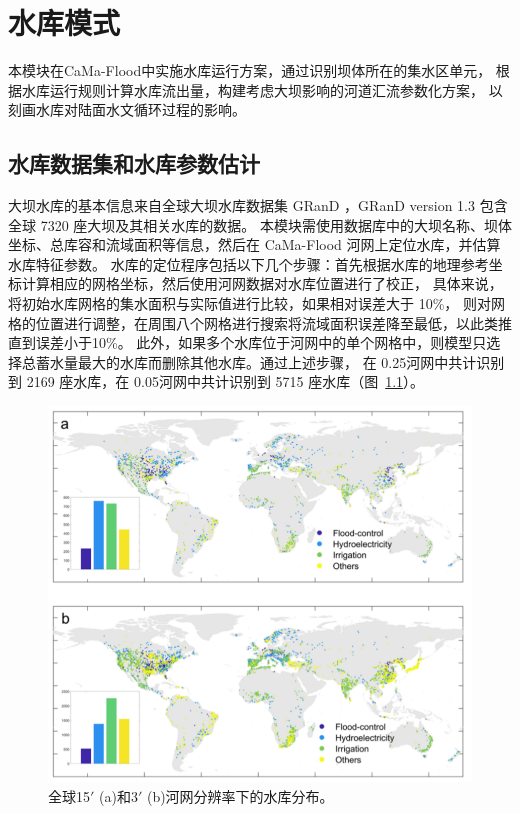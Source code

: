 \chapter{水库模式}

    本模块在CaMa-Flood中实施水库运行方案，通过识别坝体所在的集水区单元，
    根据水库运行规则计算水库流出量，构建考虑大坝影响的河道汇流参数化方案，
    以刻画水库对陆面水文循环过程的影响。
    
\section{水库数据集和水库参数估计}\label{水库数据集和水库参数估计}
大坝水库的基本信息来自全球大坝水库数据集 GRanD \citep{lehner2011high}，GRanD version 1.3 包含全球 7320 座大坝及其相关水库的数据。
本模块需使用数据库中的大坝名称、坝体坐标、总库容和流域面积等信息，然后在 CaMa-Flood 河网上定位水库，并估算水库特征参数。
水库的定位程序包括以下几个步骤：首先根据水库的地理参考坐标计算相应的网格坐标，然后使用河网数据对水库位置进行了校正，
具体来说，将初始水库网格的集水面积与实际值进行比较，如果相对误差大于 10\%，
则对网格的位置进行调整，在周围八个网格进行搜索将流域面积误差降至最低，以此类推直到误差小于10\%。
此外，如果多个水库位于河网中的单个网格中，则模型只选择总蓄水量最大的水库而删除其他水库。通过上述步骤，
在 0.25\textdegree 河网中共计识别到 2169 座水库，在 0.05\textdegree 河网中共计识别到 5715 座水库（图~\ref{fig:水库分布}）。

{
\begin{figure}[]
\centering
\includegraphics{Figures/陆地表面的水分循环/水库分布.png}
\caption{全球15$'$ (a)和3$'$ (b)河网分辨率下的水库分布。}
\label{fig:水库分布}
\end{figure}
}

